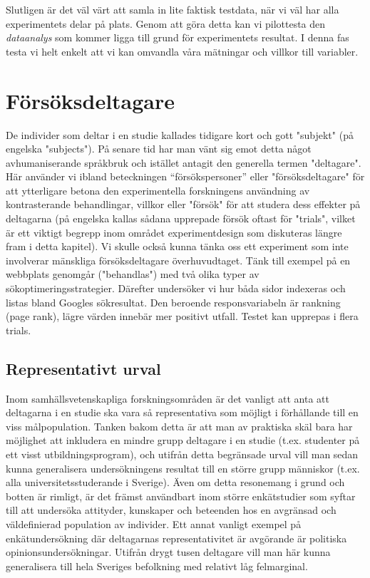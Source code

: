 \documentclass[
]{book}
\begin{document}
Slutligen är det väl värt att samla in lite faktisk testdata, när vi väl har alla experimentets delar på plats. Genom att göra detta kan vi pilottesta den \emph{dataanalys} som kommer ligga till grund för experimentets resultat. I denna fas testa vi helt enkelt att vi kan omvandla våra mätningar och villkor till variabler.

\hypertarget{sec07.2}{%
\section{Försöksdeltagare}\label{sec07.2}}

De individer som deltar i en studie kallades tidigare kort och gott "subjekt" (på engelska "subjects"). På senare tid har man vänt sig emot detta något avhumaniserande språkbruk och istället antagit den generella termen "deltagare". Här använder vi ibland beteckningen ``försökspersoner'' eller "försöksdeltagare" för att ytterligare betona den experimentella forskningens användning av kontrasterande behandlingar, villkor eller "försök" för att studera dess effekter på deltagarna (på engelska kallas sådana upprepade försök oftast för "trials", vilket är ett viktigt begrepp inom området experimentdesign som diskuteras längre fram i detta kapitel). Vi skulle också kunna tänka oss ett experiment som inte involverar mänskliga försöksdeltagare överhuvudtaget. Tänk till exempel på en webbplats genomgår ("behandlas") med två olika typer av sökoptimeringsstrategier. Därefter undersöker vi hur båda sidor indexeras och listas bland Googles sökresultat. Den beroende responsvariabeln är rankning (page rank), lägre värden innebär mer positivt utfall. Testet kan upprepas i flera trials.

\hypertarget{sub07.2.1}{%
\subsection{Representativt urval}\label{sub07.2.1}}

Inom samhällsvetenskapliga forskningsområden är det vanligt att anta att deltagarna i en studie ska vara så representativa som möjligt i förhållande till en viss målpopulation. Tanken bakom detta är att man av praktiska skäl bara har möjlighet att inkludera en mindre grupp deltagare i en studie (t.ex. studenter på ett visst utbildningsprogram), och utifrån detta begränsade urval vill man sedan kunna generalisera undersökningens resultat till en större grupp människor (t.ex. alla universitetsstuderande i Sverige). Även om detta resonemang i grund och botten är rimligt, är det främst användbart inom större enkätstudier som syftar till att undersöka attityder, kunskaper och beteenden hos en avgränsad och väldefinierad population av individer. Ett annat vanligt exempel på enkätundersökning där deltagarnas representativitet är avgörande är politiska opinionsundersökningar. Utifrån drygt tusen deltagare vill man här kunna generalisera till hela Sveriges befolkning med relativt låg felmarginal.
\end{document}

